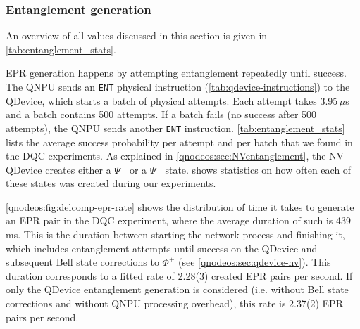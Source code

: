 \subsubsection{Entanglement generation}

An overview of all values discussed in this section is given in \cref{tab:entanglement_stats}.

\ac{EPR} generation happens by attempting entanglement repeatedly until success. The \ac{QNPU} sends an \texttt{ENT} physical instruction (\cref{tab:qdevice-instructions}) to the \ac{QDevice}, which starts a batch of physical attempts. Each attempt takes 3.95\,$\mu$s and a batch contains 500 attempts. If a batch fails (no success after 500 attempts), the \ac{QNPU} sends another \texttt{ENT} instruction. \cref{tab:entanglement_stats} lists the average success probability per attempt and per batch that we found in the \ac{DQC} experiments. As explained in \cref{qnodeos:sec:NVentanglement}, the \ac{NV} \ac{QDevice} creates either a $\Psi^+$ or a $\Psi^-$ state.  shows statistics on how often each of these states was created during our experiments.

\cref{qnodeos:fig:delcomp-epr-rate} shows the distribution of time it takes to generate an \ac{EPR} pair in the \ac{DQC} experiment, where the average duration of such is 439\,ms. This is the duration between starting the network process and finishing it, which includes entanglement attempts until success on the \ac{QDevice} and subsequent Bell state corrections to $\Phi^+$ (see \cref{qnodeos:sec:qdevice-nv}). This duration corresponds to a fitted rate of 2.28(3) created \ac{EPR} pairs per second. If only the \ac{QDevice} entanglement generation is considered (i.e. without Bell state corrections and without \ac{QNPU} processing overhead), this rate is 2.37(2) \ac{EPR} pairs per second.

